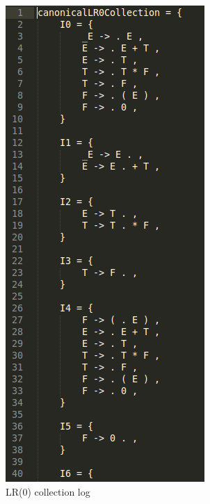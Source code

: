 \documentclass{beamer}
\begin{document}
\begin{frame}
\begin{figure}
    \centering
    \begin{subfigure}[b]{0.3\textwidth}
        \includegraphics[height=0.8\textheight]{LogLR0Collection.png}
        \caption{LR(0) collection log}
        \label{fig:lr0collection}
    \end{subfigure}
    ~ %
    \begin{subfigure}[b]{0.3\textwidth}

\end{subfigure}
\end{figure}
\end{frame}
\end{document}
